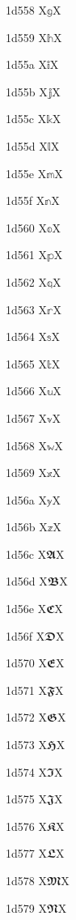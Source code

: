 \documentclass[11pt]{article}
\begin{document}
1d558 X{\ensuremath{\mathbb{g}}}X

1d559 X{\ensuremath{\mathbb{h}}}X

1d55a X{\ensuremath{\mathbb{i}}}X

1d55b X{\ensuremath{\mathbb{j}}}X

1d55c X{\ensuremath{\mathbb{k}}}X

1d55d X{\ensuremath{\mathbb{l}}}X

1d55e X{\ensuremath{\mathbb{m}}}X

1d55f X{\ensuremath{\mathbb{n}}}X

1d560 X{\ensuremath{\mathbb{o}}}X

1d561 X{\ensuremath{\mathbb{p}}}X

1d562 X{\ensuremath{\mathbb{q}}}X

1d563 X{\ensuremath{\mathbb{r}}}X

1d564 X{\ensuremath{\mathbb{s}}}X

1d565 X{\ensuremath{\mathbb{t}}}X

1d566 X{\ensuremath{\mathbb{u}}}X

1d567 X{\ensuremath{\mathbb{v}}}X

1d568 X{\ensuremath{\mathbb{w}}}X

1d569 X{\ensuremath{\mathbb{x}}}X

1d56a X{\ensuremath{\mathbb{y}}}X

1d56b X{\ensuremath{\mathbb{z}}}X

1d56c X{\ensuremath{\mathbffrak{A}}}X

1d56d X{\ensuremath{\mathbffrak{B}}}X

1d56e X{\ensuremath{\mathbffrak{C}}}X

1d56f X{\ensuremath{\mathbffrak{D}}}X

1d570 X{\ensuremath{\mathbffrak{E}}}X

1d571 X{\ensuremath{\mathbffrak{F}}}X

1d572 X{\ensuremath{\mathbffrak{G}}}X

1d573 X{\ensuremath{\mathbffrak{H}}}X

1d574 X{\ensuremath{\mathbffrak{I}}}X

1d575 X{\ensuremath{\mathbffrak{J}}}X

1d576 X{\ensuremath{\mathbffrak{K}}}X

1d577 X{\ensuremath{\mathbffrak{L}}}X

1d578 X{\ensuremath{\mathbffrak{M}}}X

1d579 X{\ensuremath{\mathbffrak{N}}}X
\end{document}

